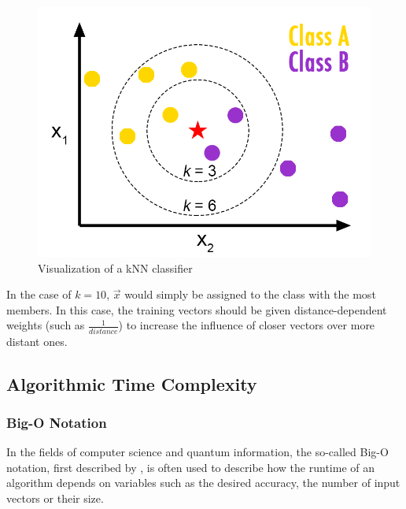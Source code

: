 \begin{figure}[H]
      \centering
       \includegraphics[scale=0.55]{img/knn-concept.png}
       \caption[caption for kNN]{\label{fig:knnconcept} Visualization of a kNN classifier\footnotemark[4]}
\end{figure}


In the case of $k = 10$, $\vec{x}$ would simply be assigned to the class with the most members. In this case, the training vectors should be given distance-dependent weights (such as $\frac{1}{distance}$) to increase the influence of closer vectors over more distant ones.

\subsection{Algorithmic Time Complexity}
\label{subsubsec:algcomplexity}

\subsubsection{Big-O Notation}
\label{subsubsubsec:bigO}

In the fields of computer science and quantum information, the so-called Big-O notation, first described by , is often used to describe how the runtime of an algorithm depends on variables such as the desired accuracy, the number of input vectors or their size.


